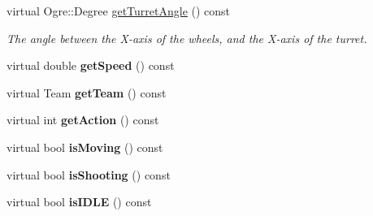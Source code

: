 \begin{DoxyCompactItemize}
\item 
virtual Ogre\+::\+Degree \hyperlink{class_robot_a11e5ffac2bc13d610406e2a791661788}{get\+Turret\+Angle} () const 
\begin{DoxyCompactList}\small\item\em The angle between the X-\/axis of the wheels, and the X-\/axis of the turret. \end{DoxyCompactList}\item 
virtual double {\bfseries get\+Speed} () const \hypertarget{class_robot_a51a941b259f52d3189d638be80e3a7be}{}\label{class_robot_a51a941b259f52d3189d638be80e3a7be}

\item 
virtual Team {\bfseries get\+Team} () const \hypertarget{class_robot_a8bf33cb05e84c73c2cdb2b266282a59f}{}\label{class_robot_a8bf33cb05e84c73c2cdb2b266282a59f}

\item 
virtual int {\bfseries get\+Action} () const \hypertarget{class_robot_a4e47f4a32f0d7b0ea911a1bbf1cad7ef}{}\label{class_robot_a4e47f4a32f0d7b0ea911a1bbf1cad7ef}

\item 
virtual bool {\bfseries is\+Moving} () const \hypertarget{class_robot_a1cecc2e1972fc22ea27d214a45e175b7}{}\label{class_robot_a1cecc2e1972fc22ea27d214a45e175b7}

\item 
virtual bool {\bfseries is\+Shooting} () const \hypertarget{class_robot_ab0ab556eaddc3646a9637dbc9e00fd00}{}\label{class_robot_ab0ab556eaddc3646a9637dbc9e00fd00}

\item 
virtual bool {\bfseries is\+I\+D\+LE} () const \hypertarget{class_robot_ac7df18d3817fa2b30e21817b55d9c73f}{}\label{class_robot_ac7df18d3817fa2b30e21817b55d9c73f}

\end{DoxyCompactItemize}
